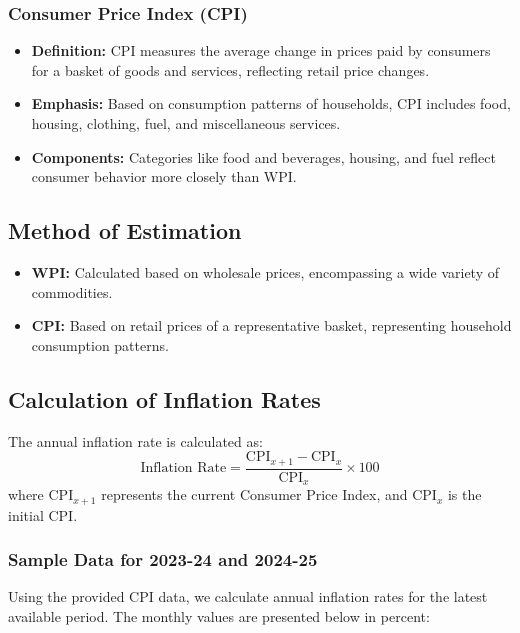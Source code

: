 \documentclass[a4paper,12pt]{extarticle} %
\begin{document}
\subsubsection{Consumer Price Index (CPI)}
\begin{itemize}
    \item \textbf{Definition:} CPI measures the average change in prices paid by consumers for a basket of goods and services, reflecting retail price changes.
    \item \textbf{Emphasis:} Based on consumption patterns of households, CPI includes food, housing, clothing, fuel, and miscellaneous services.
    \item \textbf{Components:} Categories like food and beverages, housing, and fuel reflect consumer behavior more closely than WPI.
\end{itemize}

\subsection{Method of Estimation}
\begin{itemize}
    \item \textbf{WPI:} Calculated based on wholesale prices, encompassing a wide variety of commodities.
    \item \textbf{CPI:} Based on retail prices of a representative basket, representing household consumption patterns.
\end{itemize}

\subsection{Calculation of Inflation Rates}
The annual inflation rate is calculated as:
\[
\text{Inflation Rate} = \frac{\text{CPI}_{x+1} - \text{CPI}_{x}}{\text{CPI}_{x}} \times 100
\]
where $\text{CPI}_{x+1}$ represents the current Consumer Price Index, and $\text{CPI}_{x}$ is the initial CPI.

\subsubsection{Sample Data for 2023-24 and 2024-25}
Using the provided CPI data, we calculate annual inflation rates for the latest available period. The monthly values are presented below in percent:
\end{document}
